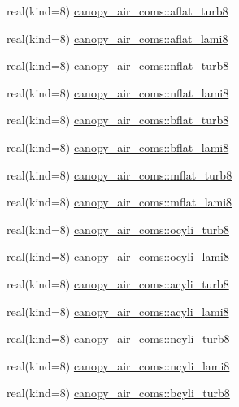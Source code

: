 \begin{DoxyCompactItemize}
\item 
real(kind=8) \hyperlink{namespacecanopy__air__coms_a74069fab7440b8c4adf33de11779b980}{canopy\+\_\+air\+\_\+coms\+::aflat\+\_\+turb8}
\item 
real(kind=8) \hyperlink{namespacecanopy__air__coms_af642ae1aafe80d1c6e7fde278a2236df}{canopy\+\_\+air\+\_\+coms\+::aflat\+\_\+lami8}
\item 
real(kind=8) \hyperlink{namespacecanopy__air__coms_afd3231b755fb237410e1c5996483b57e}{canopy\+\_\+air\+\_\+coms\+::nflat\+\_\+turb8}
\item 
real(kind=8) \hyperlink{namespacecanopy__air__coms_af9e1b7d0da6156fb9ca9fc9ae5c8eadc}{canopy\+\_\+air\+\_\+coms\+::nflat\+\_\+lami8}
\item 
real(kind=8) \hyperlink{namespacecanopy__air__coms_acb451ffb0cf75be9e6269398d5404f07}{canopy\+\_\+air\+\_\+coms\+::bflat\+\_\+turb8}
\item 
real(kind=8) \hyperlink{namespacecanopy__air__coms_a81f50c2e4f31633b624d8c3682751b7f}{canopy\+\_\+air\+\_\+coms\+::bflat\+\_\+lami8}
\item 
real(kind=8) \hyperlink{namespacecanopy__air__coms_a68b2e1b18a4e08daa7ddf8aa42b9958d}{canopy\+\_\+air\+\_\+coms\+::mflat\+\_\+turb8}
\item 
real(kind=8) \hyperlink{namespacecanopy__air__coms_a5deb3fac84d48b1bc1dcb105eb01722d}{canopy\+\_\+air\+\_\+coms\+::mflat\+\_\+lami8}
\item 
real(kind=8) \hyperlink{namespacecanopy__air__coms_ace22bf19aec35f5683446ad8de930257}{canopy\+\_\+air\+\_\+coms\+::ocyli\+\_\+turb8}
\item 
real(kind=8) \hyperlink{namespacecanopy__air__coms_a6fe72df71f0ed3c59b06b99e7291d5f5}{canopy\+\_\+air\+\_\+coms\+::ocyli\+\_\+lami8}
\item 
real(kind=8) \hyperlink{namespacecanopy__air__coms_a933920d4f406fd57c33f8cef1ca8bb83}{canopy\+\_\+air\+\_\+coms\+::acyli\+\_\+turb8}
\item 
real(kind=8) \hyperlink{namespacecanopy__air__coms_a325f601d72eb729cc4301008156be76b}{canopy\+\_\+air\+\_\+coms\+::acyli\+\_\+lami8}
\item 
real(kind=8) \hyperlink{namespacecanopy__air__coms_ad86960a7895c92e10af6d10cae324f82}{canopy\+\_\+air\+\_\+coms\+::ncyli\+\_\+turb8}
\item 
real(kind=8) \hyperlink{namespacecanopy__air__coms_a6f097ca1a4dda12b169f6686939871c0}{canopy\+\_\+air\+\_\+coms\+::ncyli\+\_\+lami8}
\item 
real(kind=8) \hyperlink{namespacecanopy__air__coms_a2f1fda0ccc380bdd8526ea6e1fecb924}{canopy\+\_\+air\+\_\+coms\+::bcyli\+\_\+turb8}

\end{DoxyCompactItemize}
